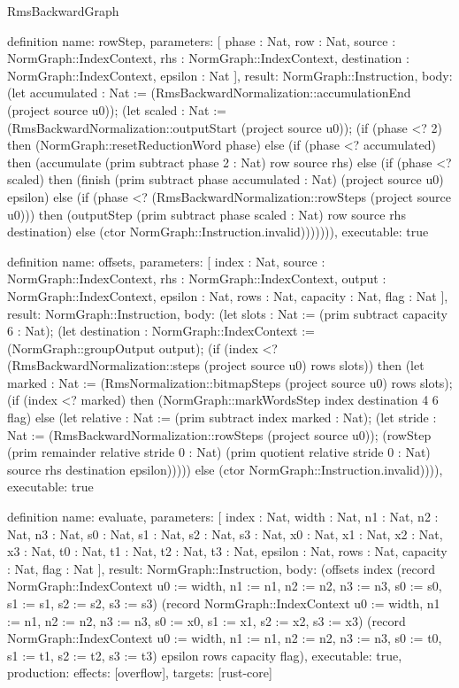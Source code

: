 \begin{lexlean}{RmsBackwardGraph}
\begin{semanticmodule}
definition{
  name: rowStep,
  parameters: [
    phase : Nat,
    row : Nat,
    source : NormGraph::IndexContext,
    rhs : NormGraph::IndexContext,
    destination : NormGraph::IndexContext,
    epsilon : Nat
  ],
  result: NormGraph::Instruction,
  body: (let accumulated : Nat := (RmsBackwardNormalization::accumulationEnd (project source u0)); (let scaled : Nat := (RmsBackwardNormalization::outputStart (project source u0)); (if (phase <? 2) then (NormGraph::resetReductionWord phase) else (if (phase <? accumulated) then (accumulate (prim subtract phase 2 : Nat) row source rhs) else (if (phase <? scaled) then (finish (prim subtract phase accumulated : Nat) (project source u0) epsilon) else (if (phase <? (RmsBackwardNormalization::rowSteps (project source u0))) then (outputStep (prim subtract phase scaled : Nat) row source rhs destination) else (ctor NormGraph::Instruction.invalid))))))),
  executable: true
}

definition{
  name: offsets,
  parameters: [
    index : Nat,
    source : NormGraph::IndexContext,
    rhs : NormGraph::IndexContext,
    output : NormGraph::IndexContext,
    epsilon : Nat,
    rows : Nat,
    capacity : Nat,
    flag : Nat
  ],
  result: NormGraph::Instruction,
  body: (let slots : Nat := (prim subtract capacity 6 : Nat); (let destination : NormGraph::IndexContext := (NormGraph::groupOutput output); (if (index <? (RmsBackwardNormalization::steps (project source u0) rows slots)) then (let marked : Nat := (RmsNormalization::bitmapSteps (project source u0) rows slots); (if (index <? marked) then (NormGraph::markWordsStep index destination 4 6 flag) else (let relative : Nat := (prim subtract index marked : Nat); (let stride : Nat := (RmsBackwardNormalization::rowSteps (project source u0)); (rowStep (prim remainder relative stride 0 : Nat) (prim quotient relative stride 0 : Nat) source rhs destination epsilon))))) else (ctor NormGraph::Instruction.invalid)))),
  executable: true
}

definition{
  name: evaluate,
  parameters: [
    index : Nat,
    width : Nat,
    n1 : Nat,
    n2 : Nat,
    n3 : Nat,
    s0 : Nat,
    s1 : Nat,
    s2 : Nat,
    s3 : Nat,
    x0 : Nat,
    x1 : Nat,
    x2 : Nat,
    x3 : Nat,
    t0 : Nat,
    t1 : Nat,
    t2 : Nat,
    t3 : Nat,
    epsilon : Nat,
    rows : Nat,
    capacity : Nat,
    flag : Nat
  ],
  result: NormGraph::Instruction,
  body: (offsets index (record NormGraph::IndexContext {u0 := width, n1 := n1, n2 := n2, n3 := n3, s0 := s0, s1 := s1, s2 := s2, s3 := s3}) (record NormGraph::IndexContext {u0 := width, n1 := n1, n2 := n2, n3 := n3, s0 := x0, s1 := x1, s2 := x2, s3 := x3}) (record NormGraph::IndexContext {u0 := width, n1 := n1, n2 := n2, n3 := n3, s0 := t0, s1 := t1, s2 := t2, s3 := t3}) epsilon rows capacity flag),
  executable: true,
  production: {effects: [overflow], targets: [rust-core]}
}


\end{semanticmodule}
\end{lexlean}
